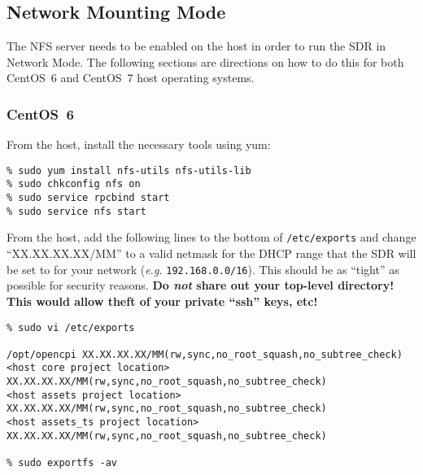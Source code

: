 \iffalse
This file is protected by Copyright. Please refer to the COPYRIGHT file
distributed with this source distribution.

This file is part of OpenCPI <http://www.opencpi.org>

OpenCPI is free software: you can redistribute it and/or modify it under the
terms of the GNU Lesser General Public License as published by the Free Software
Foundation, either version 3 of the License, or (at your option) any later
version.

OpenCPI is distributed in the hope that it will be useful, but WITHOUT ANY
WARRANTY; without even the implied warranty of MERCHANTABILITY or FITNESS FOR A
PARTICULAR PURPOSE. See the GNU Lesser General Public License for more details.

You should have received a copy of the GNU Lesser General Public License along
with this program. If not, see <http://www.gnu.org/licenses/>.
\fi

\newlength{\savedparindentnfs}%
\setlength{\savedparindentnfs}{\parindent}%
\setlength{\parindent}{0pt} %
\providecommand{\forceindent}{\leavevmode{\parindent=1em\indent}}%

\subsection{Network Mounting Mode}
\label{sec:network_mode}
The NFS server needs to be enabled on the host in order to run the SDR in Network Mode.
The following sections are directions on how to do this for both CentOS~6 and CentOS~7 host operating systems.
\subsubsection{CentOS~6}
From the host, install the necessary tools using yum:
\begin{verbatim}
% sudo yum install nfs-utils nfs-utils-lib
% sudo chkconfig nfs on
% sudo service rpcbind start
% sudo service nfs start
\end{verbatim}

From the host, add the following lines to the bottom of \texttt{/etc/exports} and change ``XX.XX.XX.XX/MM'' to a valid netmask for the DHCP range that the SDR will be set to for your network (\textit{e.g.} \texttt{192.168.0.0/16}).
This should be as ``tight'' as possible for security reasons. \textbf{Do \textit{not} share out your top-level directory! This would allow theft of your private ``ssh'' keys, etc!} %
\begin{verbatim}
% sudo vi /etc/exports

/opt/opencpi XX.XX.XX.XX/MM(rw,sync,no_root_squash,no_subtree_check)
<host core project location> XX.XX.XX.XX/MM(rw,sync,no_root_squash,no_subtree_check)
<host assets project location> XX.XX.XX.XX/MM(rw,sync,no_root_squash,no_subtree_check)
<host assets_ts project location> XX.XX.XX.XX/MM(rw,sync,no_root_squash,no_subtree_check)

% sudo exportfs -av
\end{verbatim}

